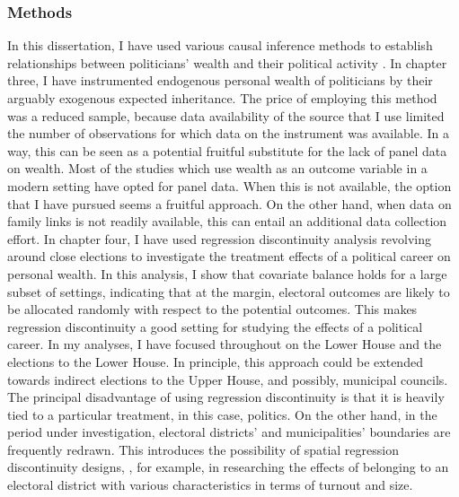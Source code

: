 \subsubsection{Methods}
In this dissertation, I have used various causal inference methods to establish relationships between politicians' wealth and their political activity \citep{cunningham2021causal}. In chapter three, I have instrumented endogenous personal wealth of politicians by their arguably exogenous expected inheritance. The price of employing this method was a reduced sample, because data availability of the source that I use limited the number of observations for which data on the instrument was available. In a way, this can be seen as a potential fruitful substitute for the lack of panel data on wealth. Most of the studies which use wealth as an outcome variable \citep{fisman2014private, berg2020politicians, berg2020returns} in a modern setting have opted for panel data. When this is not available, the option that I have pursued seems a fruitful approach. On the other hand, when data on family links is not readily available, this can entail an additional data collection effort. In chapter four, I have used regression discontinuity analysis revolving around close elections to investigate the treatment effects of a political career on personal wealth. In this analysis, I show that covariate balance holds for a large subset of settings, indicating that at the margin, electoral outcomes are likely to be allocated randomly with respect to the potential outcomes. This makes regression discontinuity a good setting for studying the effects of a political career. In my analyses, I have focused throughout on the Lower House and the elections to the Lower House. In principle, this approach could be extended towards indirect elections to the Upper House, and possibly, municipal councils. The principal disadvantage of using regression discontinuity is that it is heavily tied to a particular treatment, in this case, politics. On the other hand, in the period under investigation, electoral districts' and municipalities' boundaries are frequently redrawn. This introduces the possibility of spatial regression discontinuity designs, \citep[e.g.][]{dell2010persistent, egger2015causal, lowes2021concessions}, for example, in researching the effects of belonging to an electoral district with various characteristics in terms of turnout and size. 

